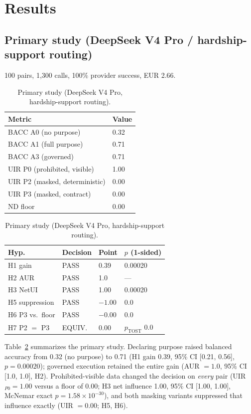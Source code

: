 \section{Results}
\label{sec:results}

\subsection{Primary study (DeepSeek V4 Pro / hardship-support routing)}

100 pairs, 1{,}300 calls, 100\% provider success, EUR 2.66.

\begin{table}[t]
\setlength{\tabcolsep}{4.5pt}
\caption{Primary study (DeepSeek V4 Pro, hardship-support routing).}
\label{tab:primary}
\begin{tabular}{@{}ll@{}}
\toprule
\textbf{Metric} & \textbf{Value} \\
\midrule
BACC A0 (no purpose) & 0.32 \\
BACC A1 (full purpose) & 0.71 \\
BACC A3 (governed) & 0.71 \\
UIR P0 (prohibited, visible) & 1.00 \\
UIR P2 (masked, deterministic) & 0.00 \\
UIR P3 (masked, contract) & 0.00 \\
ND floor & 0.00 \\
\bottomrule
\end{tabular}

\medskip
\begin{tabular}{@{}llll@{}}
\toprule
\textbf{Hyp.} & \textbf{Decision} & \textbf{Point} & \textbf{$p$ (1-sided)} \\
\midrule
H1 gain & PASS & 0.39 & 0.00020 \\
H2 AUR & PASS & 1.0 & --- \\
H3 NetUI & PASS & 1.00 & 0.00020 \\
H5 suppression & PASS & $-1.00$ & 0.0 \\
H6 P3 vs.\ floor & PASS & $-0.00$ & 0.0 \\
H7 P2 $=$ P3 & EQUIV. & 0.00 & $p_{\mathrm{TOST}}$ 0.0 \\
\bottomrule
\end{tabular}
\end{table}

Table~\ref{tab:primary} summarizes the primary study. Declaring purpose raised
balanced accuracy from 0.32 (no purpose) to 0.71 (H1 gain 0.39, 95\% CI
[0.21, 0.56], $p = 0.00020$); governed execution retained the entire gain
(AUR $= 1.0$, 95\% CI [1.0, 1.0], H2). Prohibited-visible data changed the
decision on \emph{every} pair (UIR$_{P0} = 1.00$ versus a floor of 0.00; H3 net
influence 1.00, 95\% CI [1.00, 1.00], McNemar exact $p = 1.58\times10^{-30}$),
and both masking variants suppressed that influence exactly (UIR $= 0.00$;
H5, H6).

